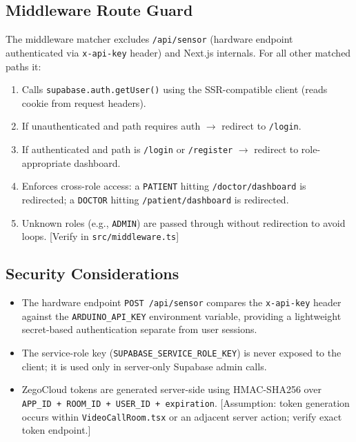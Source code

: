 \documentclass[12pt,a4paper]{report}
\begin{document}
\subsection{Middleware Route Guard}

The middleware matcher excludes \texttt{/api/sensor} (hardware endpoint
authenticated via \texttt{x-api-key} header) and Next.js internals.
For all other matched paths it:

\begin{enumerate}[leftmargin=1.5em, itemsep=0.2em]
  \item Calls \texttt{supabase.auth.getUser()} using the SSR-compatible
        client (reads cookie from request headers).
  \item If unauthenticated and path requires auth $\to$ redirect to \texttt{/login}.
  \item If authenticated and path is \texttt{/login} or \texttt{/register}
        $\to$ redirect to role-appropriate dashboard.
  \item Enforces cross-role access: a \texttt{PATIENT} hitting
        \texttt{/doctor/dashboard} is redirected; a \texttt{DOCTOR}
        hitting \texttt{/patient/dashboard} is redirected.
  \item Unknown roles (e.g., \texttt{ADMIN}) are passed through without
        redirection to avoid loops. [Verify in \texttt{src/middleware.ts}]
\end{enumerate}

\subsection{Security Considerations}

\begin{itemize}[leftmargin=1.5em]
  \item The hardware endpoint \texttt{POST /api/sensor} compares the
        \texttt{x-api-key} header against the \texttt{ARDUINO\_API\_KEY}
        environment variable, providing a lightweight secret-based
        authentication separate from user sessions.
  \item The service-role key (\texttt{SUPABASE\_SERVICE\_ROLE\_KEY}) is
        never exposed to the client; it is used only in server-only
        Supabase admin calls.
  \item ZegoCloud tokens are generated server-side using HMAC-SHA256
        over \texttt{APP\_ID + ROOM\_ID + USER\_ID + expiration}.
        [Assumption: token generation occurs within \texttt{VideoCallRoom.tsx}
        or an adjacent server action; verify exact token endpoint.]
\end{itemize}
\end{document}
